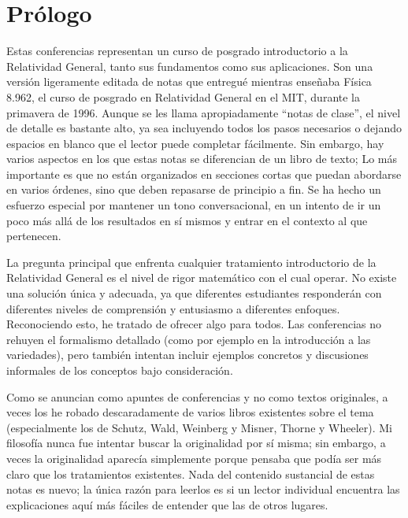 \documentclass[11pt,b5paper,openany,twoside]{book}
\begin{document}
{\normalfont\fontsize{9.4pt}{1em}\selectfont
    \thispagestyle{plain}
    \begin{quote}
        \tableofcontents
        \thispagestyle{plain}
    \end{quote}
    \normalfont\selectfont}

\mainmatter

\chapter*{Prólogo}

Estas conferencias representan un curso de posgrado introductorio a la Relatividad General, tanto sus fundamentos como sus aplicaciones.
Son una versión ligeramente editada de notas que entregué mientras enseñaba Física 8.962, el curso de posgrado en Relatividad General en el MIT, durante la primavera de 1996.
Aunque se les llama apropiadamente ``notas de clase'', el nivel de detalle es bastante alto, ya sea incluyendo todos los pasos necesarios o dejando espacios en blanco que el lector puede completar fácilmente.
Sin embargo, hay varios aspectos en los que estas notas se diferencian de un libro de texto; Lo más importante es que no están organizados en secciones cortas que puedan abordarse en varios órdenes, sino que deben repasarse de principio a fin.
Se ha hecho un esfuerzo especial por mantener un tono conversacional, en un intento de ir un poco más allá de los resultados en sí mismos y entrar en el contexto al que pertenecen.

La pregunta principal que enfrenta cualquier tratamiento introductorio de la Relatividad General es el nivel de rigor matemático con el cual operar.
No existe una solución única y adecuada, ya que diferentes estudiantes responderán con diferentes niveles de comprensión y entusiasmo a diferentes enfoques.
Reconociendo esto, he tratado de ofrecer algo para todos.
Las conferencias no rehuyen el formalismo detallado (como por ejemplo en la introducción a las variedades), pero también intentan incluir ejemplos concretos y discusiones informales de los conceptos bajo consideración.

Como se anuncian como apuntes de conferencias y no como textos originales, a veces los he robado descaradamente de varios libros existentes sobre el tema (especialmente los de Schutz, Wald, Weinberg y Misner, Thorne y Wheeler).
Mi filosofía nunca fue intentar buscar la originalidad por sí misma; sin embargo, a veces la originalidad aparecía simplemente porque pensaba que podía ser más claro que los tratamientos existentes.
Nada del contenido sustancial de estas notas es nuevo; la única razón para leerlos es si un lector individual encuentra las explicaciones aquí más fáciles de entender que las de otros lugares.
\end{document}
